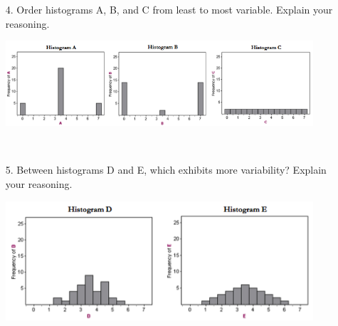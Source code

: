 \documentclass[12pt]{article}
\newcommand{\soln}[2]{$\:$\\ \vspace{#1}}{}
\begin{document}
\begin{enumerate}[resume]

\item[4.] Order histograms A, B, and C from least to most variable. Explain your reasoning.

\includegraphics[width=0.9\textwidth]{figures/histogramsVarOrderABC}

\soln{2cm}{A - least, C - medium, B - most}

\item[5.] Between histograms D and E, which exhibits more variability? Explain your reasoning.

\includegraphics[width=0.9\textwidth]{figures/histogramsVarOrderDE}

\soln{2cm}{E more variable, more observations away from mean}

\end{enumerate}
\end{document}
